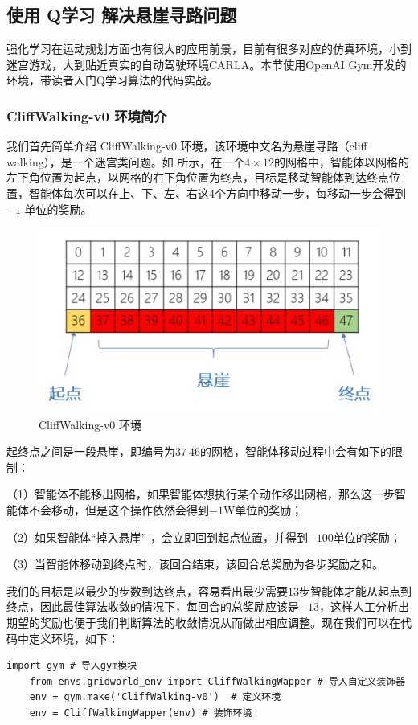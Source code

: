 \subsection{使用 Q学习 解决悬崖寻路问题} 

强化学习在运动规划方面也有很大的应用前景，目前有很多对应的仿真环境，小到迷宫游戏，大到贴近真实的自动驾驶环境CARLA。本节使用OpenAI Gym开发的环境，带读者入门Q学习算法的代码实战。

\subsubsection{CliffWalking-v0 环境简介} 

我们首先简单介绍 CliffWalking-v0 环境，该环境中文名为悬崖寻路（cliff walking），是一个迷宫类问题。如 所示，在一个$4 \times 12$的网格中，智能体以网格的左下角位置为起点，以网格的右下角位置为终点，目标是移动智能体到达终点位置，智能体每次可以在上、下、左、右这4个方向中移动一步，每移动一步会得到 $-1$ 单位的奖励。

\begin{figure}[htb]
    \centering
    \includegraphics[width=0.5\linewidth]{res/ch3/assets/cliffwalking_1}
    \caption{CliffWalking-v0 环境}
    \label{fig:cliffwalking_ch3}
\end{figure}

起终点之间是一段悬崖，即编号为$37~46$的网格，智能体移动过程中会有如下的限制：

（1）智能体不能移出网格，如果智能体想执行某个动作移出网格，那么这一步智能体不会移动，但是这个操作依然会得到$-1$W单位的奖励；

（2）如果智能体“掉入悬崖” ，会立即回到起点位置，并得到$-100$单位的奖励；

（3）当智能体移动到终点时，该回合结束，该回合总奖励为各步奖励之和。

我们的目标是以最少的步数到达终点，容易看出最少需要$13$步智能体才能从起点到终点，因此最佳算法收敛的情况下，每回合的总奖励应该是$-13$，这样人工分析出期望的奖励也便于我们判断算法的收敛情况从而做出相应调整。现在我们可以在代码中定义环境，如下：

\begin{lstlisting}[style=Python]
    import gym # 导入gym模块
    from envs.gridworld_env import CliffWalkingWapper # 导入自定义装饰器
    env = gym.make('CliffWalking-v0')  # 定义环境
    env = CliffWalkingWapper(env) # 装饰环境
\end{lstlisting}


